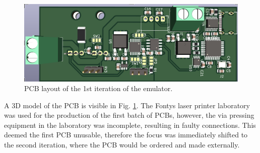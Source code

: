 \begin{figure}[!ht]
    \centering
    \includegraphics[scale=0.40]{pcb_1st_iteration.png}
    \caption{PCB layout of the 1st iteration of the emulator.}
    \label{fig:1st_pcb}
\end{figure}

A 3D model of the PCB is visible in Fig. \ref{fig:1st_pcb}.
The Fontys laser printer laboratory was used for the production 
of the first batch of PCBs, however, the via pressing equipment in the 
laboratory was incomplete, resulting in faulty connections. 
This deemed the first PCB unusable, therefore the focus was 
immediately shifted to the second iteration, where the PCB 
would be ordered and made externally.